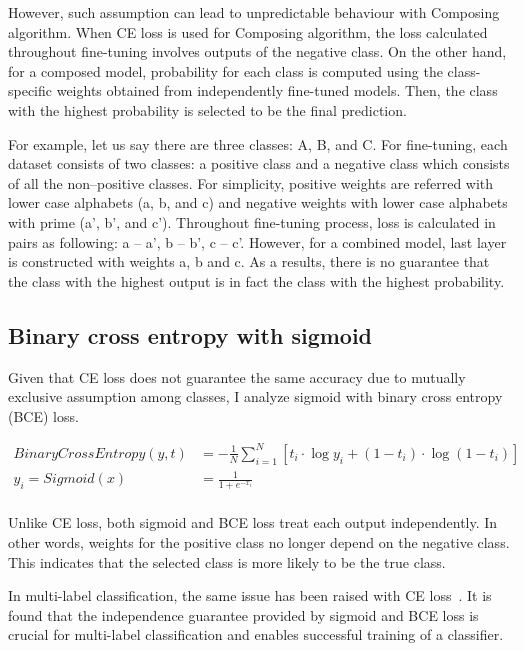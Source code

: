 \documentclass{article}
\begin{document}
However, such assumption can lead to unpredictable behaviour with Composing algorithm. When CE loss is used for Composing algorithm, the loss calculated throughout fine-tuning involves outputs of the negative class. On the other hand, for a composed model, probability for each class is computed using the class-specific weights obtained from independently fine-tuned models. Then, the class with the highest probability is selected to be the final prediction.

For example, let us say there are three classes: A, B, and C. For fine-tuning, each dataset consists of two classes: a positive class and a negative class which consists of all the non--positive classes. For simplicity, positive weights are referred with lower case alphabets (a, b, and c) and negative weights with lower case alphabets with prime (a', b', and c'). Throughout fine-tuning process, loss is calculated in pairs as following: a -- a', b -- b', c -- c'. However, for a combined model, last layer is constructed with weights a, b and c. As a results, there is no guarantee that the class with the highest output is in fact the class with the highest probability.

\subsection{Binary cross entropy with sigmoid}

Given that CE loss does not guarantee the same accuracy due to mutually exclusive assumption among classes, I analyze sigmoid with binary cross entropy (BCE) loss.

\begin{align*}
BinaryCrossEntropy(y, t) & = -\frac{1}{N}\sum_{i=1}^N \left[ t_i \cdot \log y_i + (1 - t_i) \cdot \log (1 - t_i) \right] \\
y_i = Sigmoid(x) &= \frac{1}{1 + e^{-x_i}} \\
\end{align*}

Unlike CE loss, both sigmoid and BCE loss treat each output independently. In other words, weights for the positive class no longer depend on the negative class. This indicates that the selected class is more likely to be the true class.

In multi-label classification, the same issue has been raised with CE loss~\cite{liu2017deep}. It is found that the independence guarantee provided by sigmoid and BCE loss is crucial for multi-label classification and enables successful training of a classifier.
\end{document}
